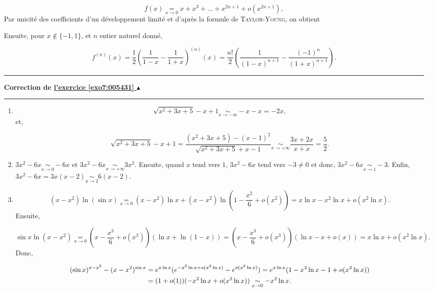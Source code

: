\documentclass[11pt,a4paper]{article}
\newcommand{\Nn}{\mathbb{N}} \newcommand{\N}{\mathbb{N}}
\newcounter{exo}
\newcommand{\correction}[1]{\hypertarget{cor7:#1}{}\label{cor7:#1}{\bf Correction de \hyperlink{exo7:#1}{l'exercice \ref{exo7:#1} $\blacktriangle$}}\vspace{1mm}\hrule\vspace{1mm}}
\newcommand{\fincorrection}{\vspace{1mm}\hrule\vspace*{7mm}}
\begin{document}
$$f(x)\underset{x\rightarrow0}{=}x+x^3+...+x^{2n+1}+o(x^{2n+1}),$$
Par unicité des coefficients d'un développement limité et d'après la formule de \textsc{Taylor}-\textsc{Young}, on obtient

\begin{center}
\shadowbox{
$\forall n\in\Nn,\;f^{(2n)}(0)=0\;\mbox{et}\;f^{(2n+1)}(0)=(2n+1)!.$
}
\end{center}
Ensuite, pour $x\notin\{-1,1\}$, et $n$ entier naturel donné, 

$$f^{(n)}(x)=\frac{1}{2}\left(\frac{1}{1-x}-\frac{1}{1+x}\right)^{(n)}(x)=\frac{n!}{2}\left(\frac{1}{(1-x)^{n+1}}-
\frac{(-1)^{n}}{(1+x)^{n+1}}\right).$$
\fincorrection
\correction{005431}

\begin{enumerate}
 \item  $$\sqrt{x^2+3x+5}-x+1\underset{x\rightarrow-\infty}{\sim}-x-x=-2x,$$ 
et,

$$\sqrt{x^2+3x+5}-x+1=\frac{(x^2+3x+5)-(x-1)^2}{\sqrt{x^2+3x+5}+x-1}
\underset{x\rightarrow+\infty}{\sim}\frac{3x+2x}{x+x}=\frac{5}{2}.$$
 \item  $3x^2-6x\underset{x\rightarrow0}{\sim}-6x$ et $3x^2-6x\underset{x\rightarrow+\infty}{\sim}3x^2$. Ensuite, quand $x$ tend vers $1$, $3x^2-6x$ tend vers $-3\neq0$ et donc, $3x^2-6x\underset{x\rightarrow1}{\sim}-3$. Enfin, 
$3x^2-6x=3x(x-2)\underset{x\rightarrow2}{\sim}6(x-2)$.

\begin{center}
\end{center}
 \item  $$(x-x^2)\ln(\sin x)\underset{x\rightarrow0}{=}(x-x^2)\ln x+(x-x^2)\ln\left(1-\frac{x^2}{6}+o(x^2)\right)=x\ln x-x^2\ln x+o(x^2\ln x).$$ 
Ensuite,

$$\sin x\ln(x-x^2)\underset{x\rightarrow0}{=}\left(x-\frac{x^3}{6}+o(x^3)\right)(\ln x+\ln(1-x))=(x-\frac{x^3}{6}+o(x^3))(\ln x-x+o(x))=x\ln x+o(x^2\ln x).$$
Donc,

\begin{align*}\ensuremath
(\sin x)^{x-x^2}-(x-x^2)^{\sin x}&=e^{x\ln x}(e^{-x^2\ln x+o(x^2\ln x)}-e^{o(x^2\ln x)})=e^{x\ln x}(1-x^2\ln x-1+o(x^2\ln x))\\
 &=(1+o(1))(-x^2\ln x+o(x^2\ln x))\underset{x\rightarrow0}{\sim}-x^2\ln x.
\end{align*}


\end{enumerate}
\end{document}
